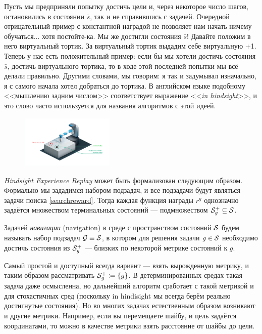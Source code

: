 Пусть мы предприняли попытку достичь цели и, через некоторое число шагов, остановились в состоянии $\bar{s}$, так и не справившись с задачей. Очередной отрицательный пример с константной наградой не позволяет нам начать ничему обучаться... хотя постойте-ка. Мы же достигли состояния $\bar{s}$! Давайте положим в него виртуальный тортик. За виртуальный тортик выдадим себе виртуальную +1. Теперь у нас есть положительный пример: если бы мы хотели достичь состояния $\bar{s}$, достичь виртуального тортика, то в ходе этой последней попытки мы всё делали правильно. Другими словами, мы говорим: я так и задумывал изначально, я с самого начала хотел добраться до тортика. В английском языке подобному <<мышлению задним числом>> соответствует выражение <<\emph{in hindsight}>>, и это слово часто используется для названия алгоритмов с этой идеей. 

\begin{figure}
\vspace{-0.5cm}
\begin{adjustwidth}{-0.4cm}{}
\includegraphics[width=0.4\textwidth]{Images/virtualgoal.png}
\end{adjustwidth}
\end{figure}

\emph{Hindsight Experience Replay} может быть формализован следующим образом. Формально мы зададимся набором подзадач, и все подзадачи будут являться задачи поиска \eqref{searchreward}. Тогда каждая функция награды $r^g$ однозначно задаётся множеством терминальных состояний --- подмножеством $\mathcal{S}^+_g \subseteq \mathcal{S}$. 

\begin{definition}
Задачей \emph{навигации} (navigation) в среде с пространством состояний $\mathcal{S}$ будем называть набор подзадач $\mathcal{G} \equiv \mathcal{S}$, в котором для решения задачи $g \in \mathcal{S}$ необходимо достичь состояния из $\mathcal{S}^+_g$ --- близких по некоторой метрике состояний к $g$.
\end{definition}

\begin{example}
Самый простой и доступный всегда вариант --- взять вырожденную метрику, и таким образом рассматривать $\mathcal{S}^+_g \coloneqq \{g\}$. В детерминированных средах такая задача даже осмысленна, но дальнейший алгоритм сработает с такой метрикой и для стохастичных сред (поскольку in hindisight мы всегда берём реально достигнутые состояния). Но во многих задачах естественным образом возникают и другие метрики. Например, если вы перемещаете шайбу, и цель задаётся координатами, то можно в качестве метрики взять расстояние от шайбы до цели. 
\end{example}

